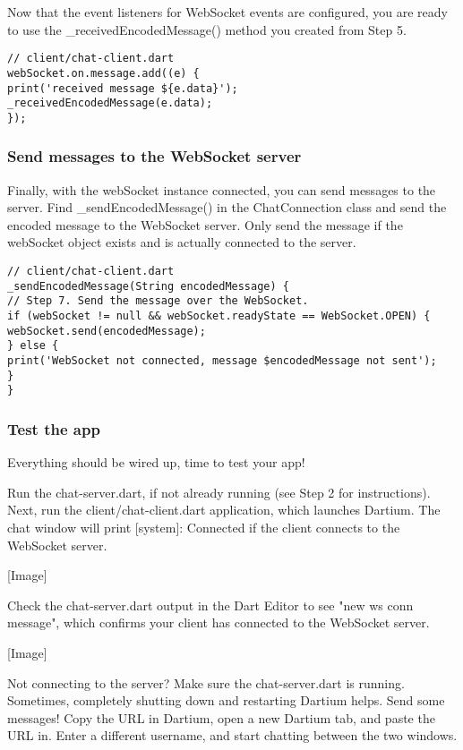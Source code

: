 Now that the event listeners for WebSocket events are configured, you are ready to use the \_receivedEncodedMessage() method you created from Step 5.

\begin{verbatim}
// client/chat-client.dart
webSocket.on.message.add((e) {
print('received message ${e.data}');
_receivedEncodedMessage(e.data);
});
\end{verbatim}

\subsubsection{Send messages to the WebSocket server}

Finally, with the webSocket instance connected, you can send messages to the server. Find \_sendEncodedMessage() in the ChatConnection class and send the encoded message to the WebSocket server. Only send the message if the webSocket object exists and is actually connected to the server.

\begin{verbatim}
// client/chat-client.dart
_sendEncodedMessage(String encodedMessage) {
// Step 7. Send the message over the WebSocket.
if (webSocket != null && webSocket.readyState == WebSocket.OPEN) {
webSocket.send(encodedMessage);
} else {
print('WebSocket not connected, message $encodedMessage not sent');
}
}
\end{verbatim}

\subsubsection{Test the app}

Everything should be wired up, time to test your app!

Run the chat-server.dart, if not already running (see Step 2 for instructions). Next, run the client/chat-client.dart application, which launches Dartium. The chat window will print [system]: Connected if the client connects to the WebSocket server.

[Image]

Check the chat-server.dart output in the Dart Editor to see "new ws conn message", which confirms your client has connected to the WebSocket server.

[Image]

Not connecting to the server? Make sure the chat-server.dart is running. Sometimes, completely shutting down and restarting Dartium helps.
Send some messages! Copy the URL in Dartium, open a new Dartium tab, and paste the URL in. Enter a different username, and start chatting between the two windows.

